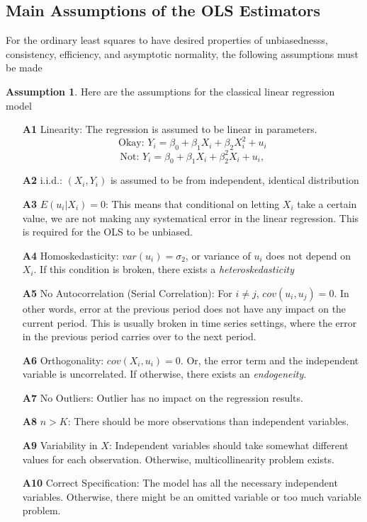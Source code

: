 \documentclass[12pt]{article}
\theoremstyle{definition}
\theoremstyle{property}
\theoremstyle{assumption}
\newtheorem{assumption}{Assumption}[section]
\theoremstyle{example}
\theoremstyle{comment}
\begin{document}
\subsection{Main Assumptions of the OLS Estimators}
For the ordinary least squares to have desired properties of unbiasednesss, consistency, efficiency, and asymptotic normality, the following assumptions must be made
\begin{mdframed}[backgroundcolor=blue!5] 
\begin{assumption} Here are the assumptions for the classical linear regression model
\begin{itemize}
\item[\textbf{A1}] Linearity: The regression is assumed to be linear in parameters.
\[
\text{Okay: } Y_i = \beta_0 + \beta_1X_i + \beta_2X_i^2+u_i 
\]
\[
\text{Not: } Y_i = \beta_0 + \beta_1X_i + \beta_2^2X_i+u_i,
\]
\item[\textbf{A2}] i.i.d.: $(X_i,Y_i)$ is assumed to be from independent, identical distribution
\item[\textbf{A3}] $E(u_i|X_i)=0$: This means that conditional on letting $X_i$ take a certain value, we are not making any systematical error in the linear regression. This is required for the OLS to be unbiased. 
\item[\textbf{A4}] Homoskedasticity: $var(u_i)=\sigma_2$, or variance of $u_i$ does not depend on $X_i$. If this condition is broken, there exists a \textit{heteroskedasticity}
\item[\textbf{A5}] No Autocorrelation (Serial Correlation): For $i\neq j$, $cov(u_i,u_j)=0$. In other words, error at the previous period does not have any impact on the current period. This is usually broken in time series settings, where the error in the previous period carries over to the next period.
\item[\textbf{A6}] Orthogonality: $cov(X_i,u_i)=0$. Or, the error term and the independent variable is uncorrelated. If otherwise, there exists an \textit{endogeneity}.
\item[\textbf{A7}] No Outliers: Outlier has no impact on the regression results.
\item[\textbf{A8}] $n>K$: There should be more observations than independent variables.
\item[\textbf{A9}] Variability in $X$: Independent variables should take somewhat different values for each observation. Otherwise, multicollinearity problem exists.
\item[\textbf{A10}] Correct Specification: The model has all the necessary independent variables. Otherwise, there might be an omitted variable or too much variable problem.
\end{itemize}
\end{assumption}
\end{mdframed}
\end{document}
